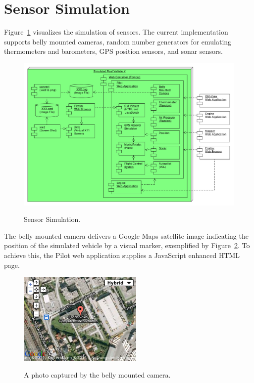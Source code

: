 \section{Sensor Simulation}
Figure~\ref{fig:SensorSimulation} visualizes the simulation of sensors.
%
The current implementation supports belly mounted cameras, random number generators for emulating thermometers and
barometers, GPS position sensors, and sonar sensors.

 
\begin{figure}[h]
	\begin{center}
		{\includegraphics[width=11.6cm]{SensorSimulation-3.pdf}}
	\end{center}
	\caption{Sensor Simulation.\label{fig:SensorSimulation}}
\end{figure}


The belly mounted camera delivers a Google Maps satellite image indicating the position of the simulated vehicle by a
visual marker, exemplified by Figure~\ref{fig:BellyMountedCamera}.
To achieve this, the Pilot web application supplies a JavaScript enhanced HTML page.
\begin{figure}[h]
	\begin{center}
		{\includegraphics[width=6cm]{bmc-photo-cosy.png}}
	\end{center}
	\caption{A photo captured by the belly mounted camera.\label{fig:BellyMountedCamera}}
\end{figure}

